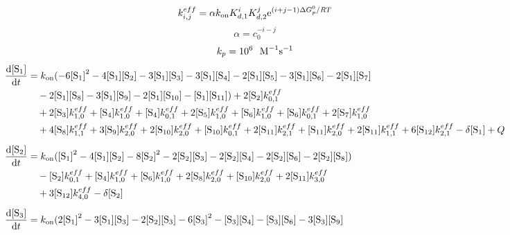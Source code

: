 \begin{equation*}k^{eff}_{i,j} = \alpha k_{\textrm{on}} K_{d,\textrm{1}}^i K_{d,\textrm{2}}^j \mathrm{e}^{(i+j-1)\Delta G_p^0/RT}\end{equation*}
\begin{equation*}\alpha = c_0^{-i - j}\end{equation*}
\begin{equation*}k_p = 10^{6}\ \ \textrm{M}^{-1}\textrm{s}^{-1}\end{equation*}
\begin{align*}\DCDtNoSpacing{\species{1}} &= \kon{}(-6\Conc{\species{1}}^2-4\Conc{\species{1}}\Conc{\species{2}}-3\Conc{\species{1}}\Conc{\species{3}}-3\Conc{\species{1}}\Conc{\species{4}}-2\Conc{\species{1}}\Conc{\species{5}}-3\Conc{\species{1}}\Conc{\species{6}}-2\Conc{\species{1}}\Conc{\species{7}}\\
 & \quad -2\Conc{\species{1}}\Conc{\species{8}}-3\Conc{\species{1}}\Conc{\species{9}}-2\Conc{\species{1}}\Conc{\species{10}}-\Conc{\species{1}}\Conc{\species{11}})+2\Conc{\species{2}}k^{eff}_{0,1}\\
 & \quad +2\Conc{\species{3}}k^{eff}_{1,0}+\Conc{\species{4}}k^{eff}_{1,0}+\Conc{\species{4}}k^{eff}_{0,1}+2\Conc{\species{5}}k^{eff}_{1,0}+\Conc{\species{6}}k^{eff}_{1,0}+\Conc{\species{6}}k^{eff}_{0,1}+2\Conc{\species{7}}k^{eff}_{1,0}\\
 & \quad +4\Conc{\species{8}}k^{eff}_{1,1}+3\Conc{\species{9}}k^{eff}_{2,0}+2\Conc{\species{10}}k^{eff}_{2,0}+\Conc{\species{10}}k^{eff}_{0,1}+2\Conc{\species{11}}k^{eff}_{2,1}+\Conc{\species{11}}k^{eff}_{2,0}+2\Conc{\species{11}}k^{eff}_{1,1}+6\Conc{\species{12}}k^{eff}_{2,1}-\delta\Conc{\species{1}}+Q\\[0.5em]
\DCDtNoSpacing{\species{2}} &= \kon{}(\Conc{\species{1}}^2-4\Conc{\species{1}}\Conc{\species{2}}-8\Conc{\species{2}}^2-2\Conc{\species{2}}\Conc{\species{3}}-2\Conc{\species{2}}\Conc{\species{4}}-2\Conc{\species{2}}\Conc{\species{6}}-2\Conc{\species{2}}\Conc{\species{8}}) \\
 & \quad -\Conc{\species{2}}k^{eff}_{0,1}+\Conc{\species{4}}k^{eff}_{1,0}+\Conc{\species{6}}k^{eff}_{1,0}+2\Conc{\species{8}}k^{eff}_{2,0}+\Conc{\species{10}}k^{eff}_{2,0}+2\Conc{\species{11}}k^{eff}_{3,0}\\
 & \quad +3\Conc{\species{12}}k^{eff}_{4,0}-\delta\Conc{\species{2}}\\[0.5em]
\DCDtNoSpacing{\species{3}} &= \kon{}(2\Conc{\species{1}}^2-3\Conc{\species{1}}\Conc{\species{3}}-2\Conc{\species{2}}\Conc{\species{3}}-6\Conc{\species{3}}^2-\Conc{\species{3}}\Conc{\species{4}}-\Conc{\species{3}}\Conc{\species{6}}-3\Conc{\species{3}}\Conc{\species{9}}\\

\end{align*}
